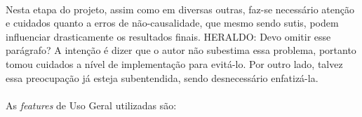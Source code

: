 \paragraph{} Nesta etapa do projeto, assim como em diversas outras, faz-se necessário atenção e cuidados quanto a erros de não-causalidade, que mesmo sendo sutis, podem influenciar drasticamente os resultados finais. \color{red} HERALDO: Devo omitir esse parágrafo? A intenção é dizer que o autor não subestima essa problema, portanto tomou cuidados a nível de implementação para evitá-lo. Por outro lado, talvez essa preocupação já esteja subentendida, sendo desnecessário enfatizá-la. 

\paragraph{} As \textit{features} de Uso Geral utilizadas são:

